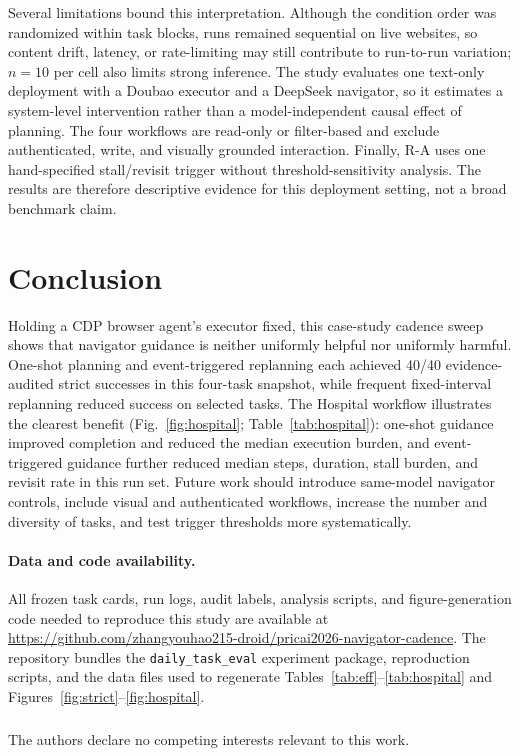 \documentclass{llncs}
\DeclareRobustCommand{\code}[1]{\allowbreak\nolinkurl{#1}\allowbreak}
\begin{document}
Several limitations bound this interpretation. Although the condition order was
randomized within task blocks, runs remained sequential on live websites, so
content drift, latency, or rate-limiting may still contribute to run-to-run
variation; $n=10$ per cell also limits strong inference. The study evaluates one
text-only deployment with a Doubao executor and a DeepSeek navigator, so it
estimates a system-level intervention rather than a model-independent causal
effect of planning. The four workflows are read-only or filter-based and exclude
authenticated, write, and visually grounded interaction. Finally, R-A uses one
hand-specified stall/revisit trigger without threshold-sensitivity analysis. The
results are therefore descriptive evidence for this deployment setting, not a
broad benchmark claim.

\section{Conclusion}

Holding a CDP browser agent's executor fixed, this case-study cadence sweep
shows that navigator guidance is neither uniformly helpful nor uniformly harmful.
One-shot planning and event-triggered replanning each achieved 40/40
evidence-audited strict successes in this four-task snapshot, while frequent
fixed-interval replanning reduced success on selected tasks. The Hospital workflow illustrates the clearest benefit
(Fig.~\ref{fig:hospital}; Table~\ref{tab:hospital}): one-shot guidance improved
completion and reduced the median execution burden, and event-triggered
guidance further reduced median steps, duration, stall burden, and revisit rate
in this run set. Future work should introduce same-model
navigator controls, include visual and authenticated workflows, increase the
number and diversity of tasks, and test trigger thresholds more systematically.

\paragraph{Data and code availability.}
All frozen task cards, run logs, audit labels, analysis scripts, and
figure-generation code needed to reproduce this study are available at
\url{https://github.com/zhangyouhao215-droid/pricai2026-navigator-cadence}.
The repository bundles the \code{daily\_task\_eval} experiment package,
reproduction scripts, and the data files used to regenerate
Tables~\ref{tab:eff}--\ref{tab:hospital} and Figures~\ref{fig:strict}--\ref{fig:hospital}.

\begin{credits}
\subsubsection{\discintname} The authors declare no competing interests
relevant to this work.
\end{credits}



\end{document}
